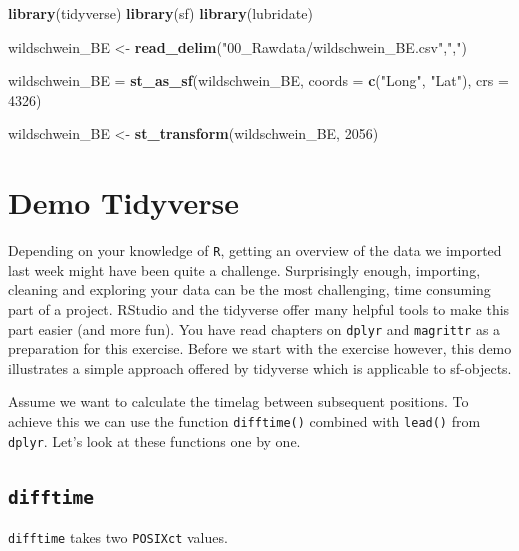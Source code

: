 \documentclass[]{book}
\newenvironment{Shaded}{\begin{snugshade}}{\end{snugshade}}
\newcommand{\DataTypeTok}[1]{\textcolor[rgb]{0.13,0.29,0.53}{#1}}
\newcommand{\DecValTok}[1]{\textcolor[rgb]{0.00,0.00,0.81}{#1}}
\newcommand{\KeywordTok}[1]{\textcolor[rgb]{0.13,0.29,0.53}{\textbf{#1}}}
\newcommand{\NormalTok}[1]{#1}
\newcommand{\StringTok}[1]{\textcolor[rgb]{0.31,0.60,0.02}{#1}}
\begin{document}
\begin{Shaded}
\begin{Highlighting}[]
\KeywordTok{library}\NormalTok{(tidyverse)}
\KeywordTok{library}\NormalTok{(sf)}
\KeywordTok{library}\NormalTok{(lubridate)}

\NormalTok{wildschwein_BE <-}\StringTok{ }\KeywordTok{read_delim}\NormalTok{(}\StringTok{"00_Rawdata/wildschwein_BE.csv"}\NormalTok{,}\StringTok{","}\NormalTok{)}

\NormalTok{wildschwein_BE =}\StringTok{ }\KeywordTok{st_as_sf}\NormalTok{(wildschwein_BE, }
                          \DataTypeTok{coords =} \KeywordTok{c}\NormalTok{(}\StringTok{"Long"}\NormalTok{, }\StringTok{"Lat"}\NormalTok{), }
                          \DataTypeTok{crs =} \DecValTok{4326}\NormalTok{)}

\NormalTok{wildschwein_BE <-}\StringTok{ }\KeywordTok{st_transform}\NormalTok{(wildschwein_BE, }\DecValTok{2056}\NormalTok{)}
\end{Highlighting}
\end{Shaded}

\hypertarget{demo-tidyverse}{%
\section{Demo Tidyverse}\label{demo-tidyverse}}

Depending on your knowledge of \texttt{R}, getting an overview of the data we imported last week might have been quite a challenge. Surprisingly enough, importing, cleaning and exploring your data can be the most challenging, time consuming part of a project. RStudio and the tidyverse offer many helpful tools to make this part easier (and more fun). You have read chapters on \texttt{dplyr} and \texttt{magrittr} as a preparation for this exercise. Before we start with the exercise however, this demo illustrates a simple approach offered by tidyverse which is applicable to sf-objects.

Assume we want to calculate the timelag between subsequent positions. To achieve this we can use the function \texttt{difftime()} combined with \texttt{lead()} from \texttt{dplyr}. Let's look at these functions one by one.

\hypertarget{difftime}{%
\subsection{\texorpdfstring{\texttt{difftime}}{difftime}}\label{difftime}}

\texttt{difftime} takes two \texttt{POSIXct} values.
\end{document}
